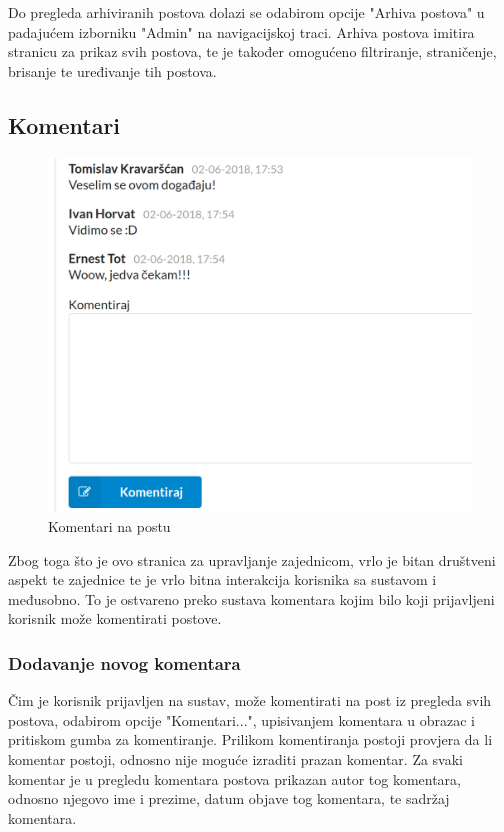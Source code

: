 \documentclass[zavrsni, numeric]{fer}
\begin{document}
Do pregleda arhiviranih postova dolazi se odabirom opcije "Arhiva postova" u padajućem izborniku "Admin" na navigacijskoj traci. Arhiva postova imitira stranicu za prikaz svih postova, te je također omogućeno filtriranje, straničenje, brisanje te uređivanje tih postova.

\subsection{Komentari}

\begin{figure}[H]
	\centering
	\includegraphics[width=13cm]{slike/komentari.png}
	\caption{Komentari na postu}
	\label{fig:komentari}
\end{figure}

Zbog toga što je ovo stranica za upravljanje zajednicom, vrlo je bitan društveni aspekt te zajednice te je vrlo bitna interakcija korisnika sa sustavom i međusobno. To je ostvareno preko sustava komentara kojim bilo koji prijavljeni korisnik može komentirati postove.

\subsubsection{Dodavanje novog komentara}

Čim je korisnik prijavljen na sustav, može komentirati na post iz pregleda svih postova, odabirom opcije "Komentari...", upisivanjem komentara u obrazac i pritiskom gumba za komentiranje. Prilikom komentiranja postoji provjera da li komentar postoji, odnosno nije moguće izraditi prazan komentar. Za svaki komentar je u pregledu komentara postova prikazan autor tog komentara, odnosno njegovo ime i prezime, datum objave tog komentara, te sadržaj komentara.
\end{document}
